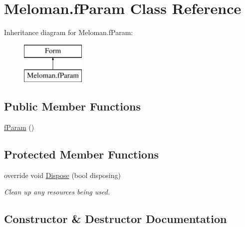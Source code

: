\hypertarget{class_meloman_1_1f_param}{}\section{Meloman.\+f\+Param Class Reference}
\label{class_meloman_1_1f_param}
Inheritance diagram for Meloman.\+f\+Param\+:\begin{figure}[H]
\begin{center}
\leavevmode
\includegraphics[height=2.000000cm]{class_meloman_1_1f_param}
\end{center}
\end{figure}
\subsection*{Public Member Functions}
\begin{DoxyCompactItemize}
\item 
\mbox{\hyperlink{class_meloman_1_1f_param_af3b9a49ffe68d7304c7dc6488b498258}{f\+Param}} ()
\end{DoxyCompactItemize}
\subsection*{Protected Member Functions}
\begin{DoxyCompactItemize}
\item 
override void \mbox{\hyperlink{class_meloman_1_1f_param_a089ac345d549519da582757365b99fef}{Dispose}} (bool disposing)
\begin{DoxyCompactList}\small\item\em Clean up any resources being used. \end{DoxyCompactList}\end{DoxyCompactItemize}


\subsection{Constructor \& Destructor Documentation}
\mbox{\label{class_meloman_1_1f_param_af3b9a49ffe68d7304c7dc6488b498258}} 
